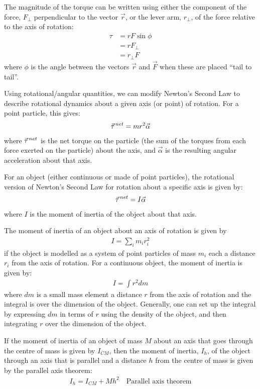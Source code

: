 \begin{chapterSummary}
The magnitude of the torque can be written using either the component of the force, $F_\perp$ perpendicular to the vector $\vec r$, or the lever arm, $r_\perp$, of the force relative to the axis of rotation:
\begin{align*}
\tau &= rF\sin\phi\\
&=rF_\perp\\
&=r_\perp F
\end{align*}
where $\phi$ is the angle between the vectors $\vec r$ and $\vec F$ when these are placed ``tail to tail''.

Using rotational/angular quantities, we can modify Newton's Second Law to describe rotational dynamics about a given axis (or point) of rotation. For a point particle, this gives:
\begin{align*}
\pvec \tau^{net} = mr^2 \vec\alpha
\end{align*}
where $\pvec \tau^{net}$ is the net torque on the particle (the sum of the torques from each force exerted on the particle) about the axis, and $\vec\alpha$ is the resulting angular acceleration about that axis.

For an object (either continuous or made of point particles), the rotational version of Newton's Second Law for rotation about a specific axis is given by:
\begin{align*}
\pvec \tau^{net} = I\vec\alpha
\end{align*} 
where $I$ is the moment of inertia of the object about that axis.

The moment of inertia of an object about an axis of rotation is given by
\begin{align*}
I = \sum_i m_ir_i^2
\end{align*}
if the object is modelled as a system of point particles of mass $m_i$ each a distance $r_i$ from the axis of rotation. For a continuous object, the moment of inertia is given by:
\begin{align*}
I = \int r^2 dm
\end{align*}
where $dm$ is a small mass element a distance $r$ from the axis of rotation and the integral is over the dimension of the object. Generally, one can set up the integral by expressing $dm$ in terms of $r$ using the density of the object, and then integrating $r$ over the dimension of the object.

If the moment of inertia of an object of mass $M$ about an axis that goes through the centre of mass is given by $I_{CM}$, then the moment of inertia, $I_h$, of the object through an axis that is parallel and a distance $h$ from the centre of mass is given by the parallel axis theorem:
\begin{align*}
I_h = I_{CM} + Mh^2 \quad \text{Parallel axis theorem}
\end{align*}


\end{chapterSummary}
